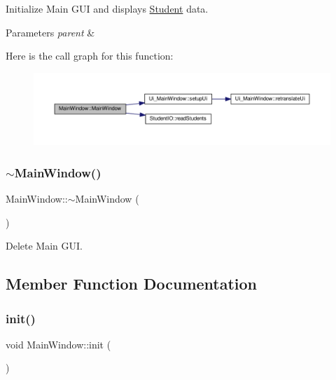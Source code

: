 Initialize Main G\+UI and displays \hyperlink{class_student}{Student} data. 


\begin{DoxyParams}{Parameters}
{\em parent} & \\
\hline
\end{DoxyParams}
Here is the call graph for this function\+:
\nopagebreak
\begin{figure}[H]
\begin{center}
\leavevmode
\includegraphics[width=350pt]{class_main_window_a8b244be8b7b7db1b08de2a2acb9409db_cgraph}
\end{center}
\end{figure}
\mbox{\label{class_main_window_ae98d00a93bc118200eeef9f9bba1dba7}} 
\subsubsection{\texorpdfstring{$\sim$\+Main\+Window()}{~MainWindow()}}
{\footnotesize\ttfamily Main\+Window\+::$\sim$\+Main\+Window (\begin{DoxyParamCaption}{ }\end{DoxyParamCaption})}



Delete Main G\+UI. 



\subsection{Member Function Documentation}
\mbox{\label{class_main_window_a671e7e5b0a3a7a3fb1cf44c5c8377952}} 
\subsubsection{\texorpdfstring{init()}{init()}}
{\footnotesize\ttfamily void Main\+Window\+::init (\begin{DoxyParamCaption}{ }\end{DoxyParamCaption})\hspace{0.3cm}{\ttfamily [static]}}



